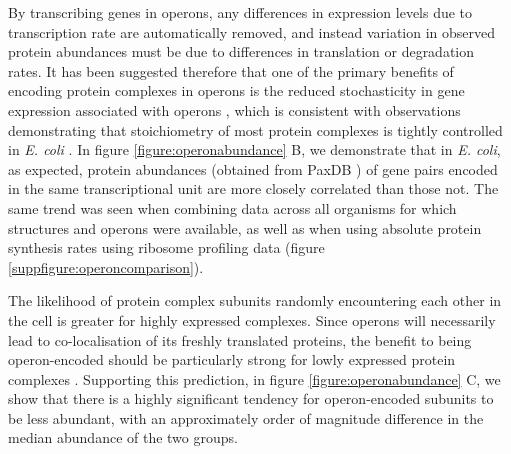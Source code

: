 \documentclass[a4paper,11pt,twoside,openright]{scrbook}
\begin{document}
By transcribing genes in operons, any differences in expression levels due to transcription rate are automatically removed, and instead variation in observed protein abundances must be due to differences in translation or degradation rates. It has been suggested therefore that one of the primary benefits of encoding protein complexes in operons is the reduced stochasticity in gene expression associated with operons \cite{Swain2004,Sneppen2010,Shieh2015a}, which is consistent with observations demonstrating that stoichiometry of most protein complexes is tightly controlled in \textit{E. coli} \cite{Li2014b}. In figure \ref{figure:operonabundance} B, we demonstrate that in \textit{E. coli}, as expected, protein abundances (obtained from PaxDB \cite{Wang2015}) of gene pairs encoded in the same transcriptional unit are more closely correlated than those not. The same trend was seen when combining data across all organisms for which structures and operons were available, as well as when using absolute protein synthesis rates using ribosome profiling data \cite{Li2014b} (figure \ref{suppfigure:operoncomparison}).

The likelihood of protein complex subunits randomly encountering each other in the cell is greater for highly expressed complexes. Since operons will necessarily lead to co-localisation of its freshly translated proteins, the benefit to being operon-encoded should be particularly strong for lowly expressed protein complexes \cite{Swain2002,Kovacs2009}. Supporting this prediction, in figure \ref{figure:operonabundance} C, we show that there is a highly significant tendency for operon-encoded subunits to be less abundant, with an approximately order of magnitude difference in the median abundance of the two groups.

\clearpage
\end{document}
